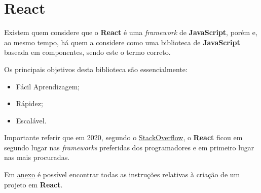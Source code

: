 \section{React}

\begin{minipage}[t]{.3\textwidth}
\end{minipage}
\begin{minipage}[t]{.7\textwidth}
	\minipagerestore
	Existem quem considere que o \textbf{React} é uma \textit{framework} de \textbf{JavaScript}, porém e, ao mesmo tempo, há quem a considere como uma biblioteca de \textbf{JavaScript} baseada em componentes, sendo este o termo correto.

	Os principais objetivos desta biblioteca são essencialmente:

	\begin{itemize}
		\item Fácil Aprendizagem;
		\item Rápidez;
		\item Escalável.
	\end{itemize}
\end{minipage}

\vspace{0.2cm}

Importante referir que em 2020, segundo o \href{https://insights.stackoverflow.com/survey/2020#technology-most-loved-dreaded-and-wanted-web-frameworks-loved2}{StackOverflow}, o \textbf{React} ficou em segundo lugar nas \textit{frameworks} preferidas dos programadores e em primeiro lugar nas mais procuradas.

Em \underline{\hyperref[reactApp]{anexo}} é possível encontrar todas as instruções relativas à criação de um projeto em \textbf{React}.



